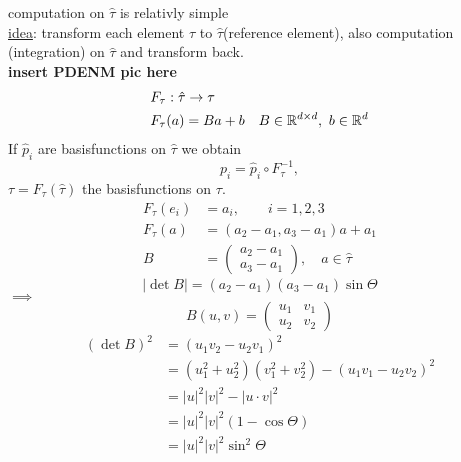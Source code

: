 \par
computation on $\hat{\tau}$ is relativly simple\\
\underline{idea}: transform each element $\tau$ to $\hat{\tau}$(reference element), also computation (integration) on $\hat{\tau}$ and transform back.\\
\textbf{insert PDENM pic here}
\begin{align*}
	&F_{\tau}: \hat{\tau} \to \tau\\
	&F_{\tau}(a) = Ba +b \quad B\in \mathbb{R}^{d\times d},\ b \in \mathbb{R}^d
\end{align*}
If $\hat{p}_i$ are basisfunctions on $\hat{\tau}$ we obtain 
\begin{equation*}
	p_i = \hat{p}_i \circ F^{-1}_{\tau},
\end{equation*}
$\tau = F_{\tau}(\hat{\tau})$ the basisfunctions on $\tau$.
\begin{align*}
	F_{\tau}(e_i) &= a_i, \qquad i=1,2,3\\
	F_{\tau}(a) &= (a_2-a_1,a_3-a_1)a + a_1\\
	B &=
	\begin{pmatrix}
	a_2-a_1\\
	a_3-a_1
	\end{pmatrix}
	,\quad a \in \hat{\tau}
\end{align*}
\begin{equation*}
	|\det B| = (a_2-a_1)(a_3-a_1)\sin \Theta
\end{equation*}
$\implies$
\begin{equation*}
	B(u,v) = 
	\begin{pmatrix}
	u_1 & v_1\\
	u_2 & v_2
	\end{pmatrix}
\end{equation*}
\begin{align*}
	(\det B)^2 & = (u_1v_2 - u_2v_1)^2\\
	& = (u^2_1+ u^2_2)(v^2_1+v^2_2)-(u_1v_1-u_2v_2)^2\\
	& = |u|^2|v|^2 - |u\cdot v|^2\\
	& = |u|^2|v|^2 (1- \cos \Theta)\\
	& = |u|^2|v|^2 \sin^2\Theta
\end{align*}
